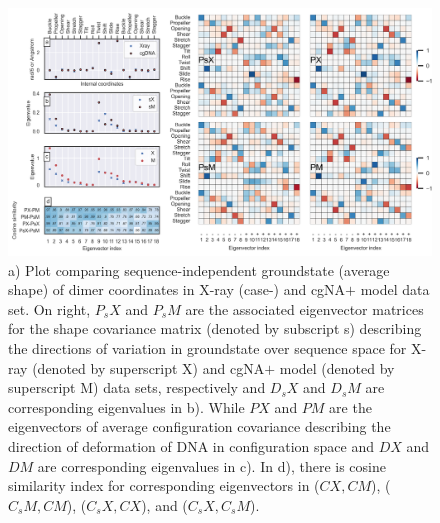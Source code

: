 \begin{figure}[H]
	\begin{center}
	\includegraphics[scale=0.9]{./Xray_images/X2_PP.png}
	\caption{a) Plot comparing sequence-independent groundstate (average shape) of dimer coordinates in X-ray (case-) and cgNA$+$ model data set. On right, $P_sX$ and $P_sM$ are the associated eigenvector matrices for the shape covariance matrix (denoted by subscript s) describing the directions of variation in groundstate over sequence space for X-ray (denoted by superscript X) and cgNA$+$ model (denoted by superscript M) data sets, respectively and $D_sX$ and $D_sM$ are corresponding eigenvalues in b). While $PX$ and $PM$ are the eigenvectors of average configuration covariance 
	describing the direction of deformation of DNA in configuration space and $DX$ and $DM$ are corresponding eigenvalues in c). In d), there is cosine similarity index for corresponding eigenvectors in ($CX,CM$), ($C_sM,CM$), ($C_sX,CX$), and ($C_sX,C_sM$).  
	}
\label{SIfig:PMPX}
\end{center}
\end{figure}

